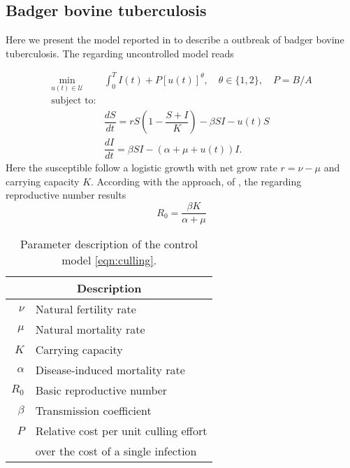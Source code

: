 \subsection*{Badger bovine tuberculosis}
Here we present the model reported in \cite*{Bolzoni2014} to describe a 
outbreak of badger bovine tuberculosis. The regarding 
uncontrolled model reads

\begin{equation}\label{eqn:culling}
	\begin{aligned}
  \min_{u(t)\in \mathcal{U}}
    &
    \int_0^T
      I(t) + P [u(t)]^{\theta}, \quad \theta \in \{1,2\},
      \quad P = B/A
  \\ \textrm{subject to:} &
  \\
    &\dfrac{dS}{dt} =
			r S 
			\left (
				1 - \dfrac{S+I}{K}
			\right)
			 - \beta SI - u(t) S
		\\
		&\dfrac{dI}{dt} =
			\beta SI - (\alpha + \mu + u(t)) I.
	\end{aligned}
\end{equation}
%
Here the susceptible follow a logistic growth with net grow rate
$r= \nu - \mu$ and carrying capacity $K$. According with the approach, 
of \citet{VandenDriessche2017}, the regarding reproductive number results
$$
  R_0 = \frac{\beta K}{\alpha + \mu}
$$ 
\begin{table}
  \begin{center}
    \begin{tabular}{@{}rl@{}}
        \toprule
      \multicolumn{2}{c}{\bf{Description}}
      \\
      \midrule
      $\nu$
        &
          Natural fertility rate
      \\
      $\mu$
        & Natural mortality rate
      \\
      $K$
        & Carrying capacity
      \\
      $\alpha$
        & Disease-induced mortality rate
      \\
      $R_0$
        & Basic reproductive number
      \\
      $\beta$
        & Transmission coefficient
      \\
      $P$
        & Relative cost per unit culling effort \\
        & over the cost of a single infection
      \\
      \bottomrule
    \end{tabular}
  \end{center}
  \caption{Parameter description of the control model \eqref{eqn:culling}.}
  \label{tbl:culling_parameter_des}
\end{table}
